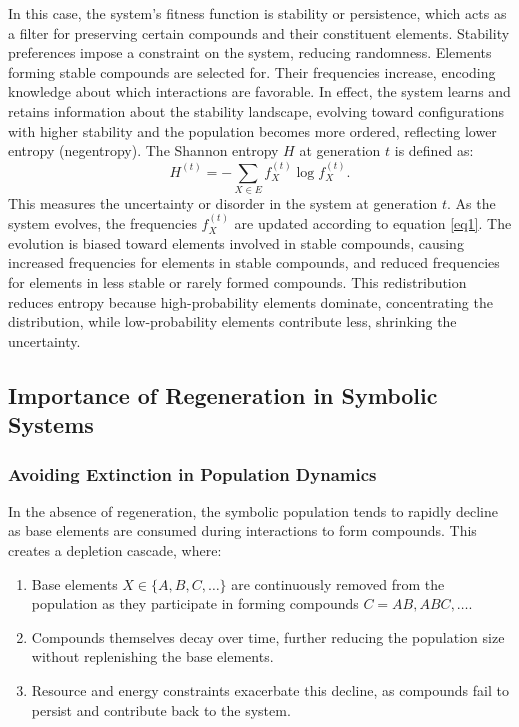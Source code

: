 \documentclass[entropy,article,submit,pdftex,moreauthors]{Definitions/mdpi}
\begin{document}
In this case, the system’s fitness function is stability or persistence, which acts as a filter for preserving certain compounds and their constituent elements. Stability preferences impose a constraint on the system, reducing randomness. Elements forming stable compounds are selected for. Their frequencies increase, encoding knowledge about which interactions are favorable. In effect, the system learns and retains information about the stability landscape, evolving toward configurations with higher stability and the population becomes more ordered, reflecting lower entropy (negentropy). The Shannon entropy \( H \) at generation \( t \) is defined as:
\[
H^{(t)} = -\sum_{X \in E} f_X^{(t)} \log f_X^{(t)}.
\]
This measures the uncertainty or disorder in the system at generation \( t \). As the system evolves, the frequencies \( f_X^{(t)} \) are updated according to equation \eqref{eq1}. The evolution is biased toward elements involved in stable compounds, causing increased frequencies for elements in stable compounds, and reduced frequencies for elements in less stable or rarely formed compounds. This redistribution reduces entropy because high-probability elements dominate, concentrating the distribution, while low-probability elements contribute less, shrinking the uncertainty.

\subsection{Importance of Regeneration in Symbolic Systems}

\subsubsection{Avoiding Extinction in Population Dynamics}

In the absence of regeneration, the symbolic population tends to rapidly decline as base elements are consumed during interactions to form compounds. This creates a depletion cascade, where:
\begin{enumerate}
    \item Base elements \( X \in \{A, B, C, \ldots\} \) are continuously removed from the population as they participate in forming compounds \( C = AB, ABC, \ldots \).
    \item Compounds themselves decay over time, further reducing the population size without replenishing the base elements.
    \item Resource and energy constraints exacerbate this decline, as compounds fail to persist and contribute back to the system.
\end{enumerate}
\end{document}
